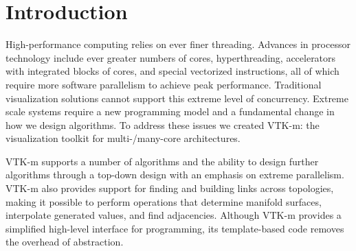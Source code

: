 
\chapter{Introduction}
\label{chap:Introduction}

High-performance computing relies on ever finer threading. Advances in
processor technology include ever greater numbers of cores, hyperthreading,
accelerators with integrated blocks of cores, and special vectorized
instructions, all of which require more software parallelism to achieve
peak performance. Traditional visualization solutions cannot support this
extreme level of concurrency. Extreme scale systems require a new
programming model and a fundamental change in how we design algorithms. To
address these issues we created VTK-m: the visualization toolkit for
multi-/many-core architectures.

VTK-m supports a number of algorithms and the ability to design further
algorithms through a top-down design with an emphasis on extreme
parallelism. VTK-m also provides support for finding and building links
across topologies, making it possible to perform operations that determine
manifold surfaces, interpolate generated values, and find adjacencies.
Although VTK-m provides a simplified high-level interface for programming,
its template-based code removes the overhead of abstraction.


